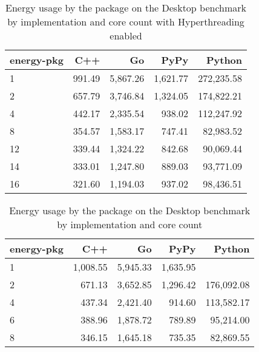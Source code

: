 \begin{table}[h]
 \centering
    \begin{tabular}{lrrrr}
    \hline
    energy-pkg & C++ & Go & PyPy & Python \\
    \hline
    1 & 991.49 & 5,867.26 & 1,621.77 & 272,235.58 \\
    2 & 657.79 & 3,746.84 & 1,324.05 & 174,822.21 \\
    4 & 442.17 & 2,335.54 & 938.02 & 112,247.92 \\
    8 & 354.57 & 1,583.17 & 747.41 & 82,983.52 \\
    12 & 339.44 & 1,324.22 & 842.68 & 90,069.44 \\
    14 & 333.01 & 1,247.80 & 889.03 & 93,771.09 \\
    16 & 321.60 & 1,194.03 & 937.02 & 98,436.51 \\
    \hline
    \end{tabular}
\caption[Desktop - Package energy consumption with Hyperthreading]{Energy usage by the package on the Desktop benchmark by implementation and core count with Hyperthreading enabled}
\label{tab:desktop-energy-pkg-hyperthreading}
\end{table}

\begin{table}[h]
    \centering
    \begin{tabular}{lrrrr}
        \hline
        energy-pkg     & C++                 & Go          & PyPy       & Python              \\
        \hline
        1              & 1,008.55            & 5,945.33    & 1,635.95   &                    \\
        2              & 671.13              & 3,652.85    & 1,296.42   & 176,092.08         \\
        4              & 437.34              & 2,421.40    & 914.60     & 113,582.17         \\
        6              & 388.96              & 1,878.72    & 789.89     & 95,214.00          \\
        8	           & 346.15              & 1,645.18    & 735.35     & 82,869.55          \\
        \hline
    \end{tabular}
\caption[Desktop - Package energy consumption]{Energy usage by the package on the Desktop benchmark by implementation and core count}
\label{tab:desktop-energy-pkg}
\end{table}

